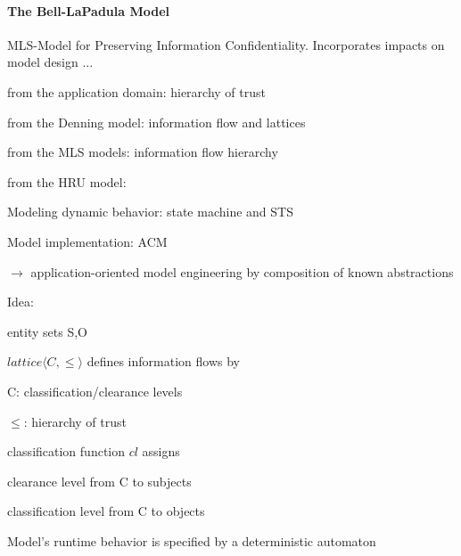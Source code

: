 \documentclass[a4paper]{article}
\begin{document}
\begin{multicols}{3}
    \paragraph{The Bell-LaPadula Model}
    MLS-Model for Preserving Information Confidentiality.
    Incorporates impacts on model design ...
    \begin{itemize*}
        \item from the application domain: hierarchy of trust
        \item from the Denning model: information flow and lattices
        \item from the MLS models: information flow hierarchy
        \item from the HRU model:
        \begin{itemize*}
            \item Modeling dynamic behavior: state machine and STS
            \item Model implementation: ACM
        \end{itemize*}
        \item $\rightarrow$ application-oriented model engineering by composition of known abstractions
    \end{itemize*}

    Idea:
    \begin{itemize*}
        \item entity sets S,O
        \item $lattice\langle C,\leq\rangle$ defines information flows by
        \begin{itemize*}
            \item C: classification/clearance levels
            \item $\leq$: hierarchy of trust
        \end{itemize*}
        \item classification function $cl$ assigns
        \begin{itemize*}
            \item clearance level from C to subjects
            \item classification level from C to objects
        \end{itemize*}
        \item Model’s runtime behavior is specified by a deterministic automaton
    \end{itemize*}


\end{multicols}
\end{document}

